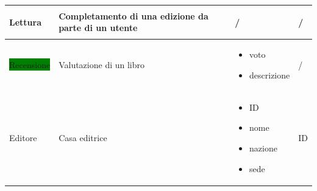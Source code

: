 \documentclass{article}
\begin{document}
\begin{center}
\begin{longtable}{|p{2cm}|p{4cm}|p{3cm}|p{2.5cm}|}
		Lettura                         & Completamento di una edizione da parte di un utente            &
		\begin{center}
			/
		\end{center}                  & \begin{center}
			                                /
		                                \end{center}                                                                                           \\
		\hline

		\colorbox{green}{Recensione}    & Valutazione di un libro                                        &
		\footnotesize
		\begin{itemize}
			\item voto
			\item descrizione
		\end{itemize}               & \begin{center}
			                              /
		                              \end{center}                                                                                             \\
		\hline
		Editore                         & Casa editrice                                                  &
		\footnotesize
		\begin{itemize}
			\item ID
			\item nome
			\item nazione
			\item sede
		\end{itemize}                 & ID                                                                                                      \\
		\hline
	\end{longtable}
\end{center}
\end{document}
